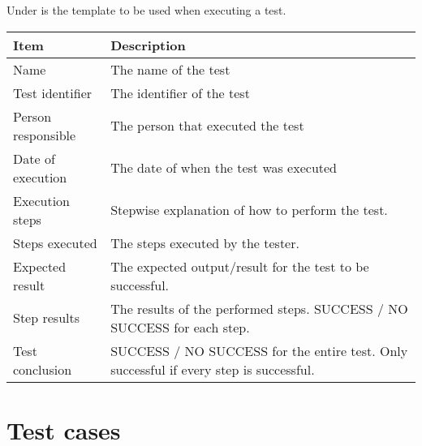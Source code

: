 \documentclass[12pt, fullpage, oneside]{report}
\begin{document}
		\vspace{8 mm}
		Under is the template to be used when executing a test.
		\vspace{8 mm}

		\begin{center}
			\begin{tabular}{ |  p{3.5cm} | p{10cm} | }
				\hline
				Item & Description \\ [5pt] \hline \hline
				Name & The name of the test \\  [5pt] \hline
				Test identifier & The identifier of the test \\  [5pt] \hline
				Person responsible & The person that executed the test \\  [5pt] \hline
				Date of execution & The date of when the test was executed \\ [5pt] \hline
				Execution steps & Stepwise explanation of how to perform the test. \\  [5pt] \hline
				Steps executed & The steps executed by the tester. \\ [5pt] \hline
				Expected result & The expected output/result for the test to be successful. \\  [5pt] \hline
				Step results & The results of the performed steps. SUCCESS / NO SUCCESS for each step. \\ [5pt] \hline
				Test conclusion & SUCCESS / NO SUCCESS for the entire test. Only successful if every step is successful. \\ [5pt] \hline
			\end{tabular}
		\end{center}

	\newpage
	\section{Test cases}
		\vspace{8 mm}		
\end{document}
